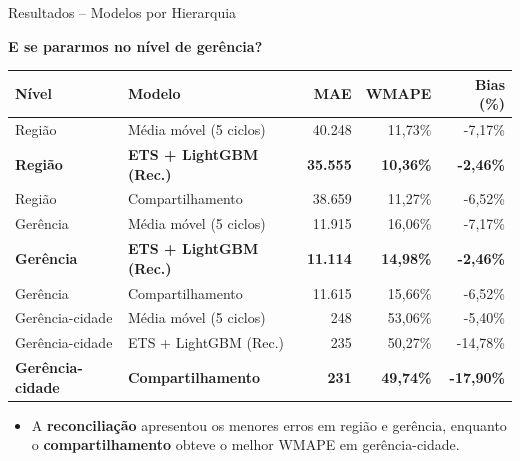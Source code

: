 \documentclass[aspectratio=169,11pt]{beamer}
\begin{document}
\begin{frame}{Resultados -- Modelos por Hierarquia}

\small
\textbf{E se pararmos no nível de gerência?}

\vspace{0.4cm}

\begin{center}
\scriptsize

\renewcommand{\arraystretch}{1.20}
\setlength{\tabcolsep}{6pt}

\begin{tabular}{llrrr}
\toprule
\textbf{Nível} &
\textbf{Modelo} &
\textbf{MAE} &
\textbf{WMAPE} &
\textbf{Bias (\%)} \\
\midrule

Região & Média móvel (5 ciclos)
& 40.248 & 11,73\% & -7,17\% \\

\textbf{Região} & \textbf{ETS + LightGBM (Rec.)}
& \textbf{35.555} & \textbf{10,36\%} & \textbf{-2,46\%} \\

Região & Compartilhamento
& 38.659 & 11,27\% & -6,52\% \\

\midrule

Gerência & Média móvel (5 ciclos)
& 11.915 & 16,06\% & -7,17\% \\

\textbf{Gerência} & \textbf{ETS + LightGBM (Rec.)}
& \textbf{11.114} & \textbf{14,98\%} & \textbf{-2,46\%} \\

Gerência & Compartilhamento
& 11.615 & 15,66\% & -6,52\% \\

\midrule

Gerência-cidade & Média móvel (5 ciclos)
& 248 & 53,06\% & -5,40\% \\

Gerência-cidade & ETS + LightGBM (Rec.)
& 235 & 50,27\% & -14,78\% \\

\textbf{Gerência-cidade} & \textbf{Compartilhamento}
& \textbf{231} & \textbf{49,74\%} & \textbf{-17,90\%} \\

\bottomrule
\end{tabular}

\end{center}

\vspace{0.5cm}

\begin{itemize}
    \item A \textbf{reconciliação} apresentou os
    menores erros em região e gerência, enquanto
    o \textbf{compartilhamento} obteve o melhor
    WMAPE em gerência-cidade.
\end{itemize}

\end{frame}
\end{document}
